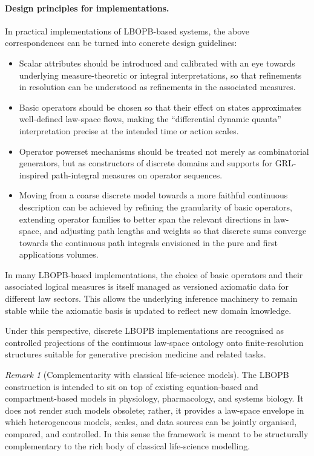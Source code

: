 \documentclass[11pt]{book}
\theoremstyle{plain}
\theoremstyle{definition}
\theoremstyle{remark}
\newtheorem{remark}[theorem]{Remark}
\begin{document}
\paragraph{Design principles for implementations.}
In practical implementations of LBOPB-based systems, the above
correspondences can be turned into concrete design guidelines:
\begin{itemize}
  \item Scalar attributes should be introduced and calibrated with an
        eye towards underlying measure-theoretic or integral
        interpretations, so that refinements in resolution can be
        understood as refinements in the associated measures.
  \item Basic operators should be chosen so that their effect on
        states approximates well-defined law-space flows, making the
        ``differential dynamic quanta'' interpretation precise at the
        intended time or action scales.
  \item Operator powerset mechanisms should be treated not merely as
        combinatorial generators, but as constructors of discrete
        domains and supports for GRL-inspired path-integral measures
        on operator sequences.
  \item Moving from a coarse discrete model towards a more faithful
        continuous description can be achieved by refining the granularity
        of basic operators, extending operator families to better span
        the relevant directions in law-space, and adjusting path
        lengths and weights so that discrete sums converge towards the
        continuous path integrals envisioned in the pure and first
        applications volumes.
\end{itemize}
In many LBOPB-based implementations, the choice of basic operators
and their associated logical measures is itself managed as versioned
axiomatic data for different law sectors. This allows the underlying
inference machinery to remain stable while the axiomatic basis is
updated to reflect new domain knowledge.

Under this perspective, discrete LBOPB implementations are recognised
as controlled projections of the continuous law-space ontology onto
finite-resolution structures suitable for generative precision
medicine and related tasks.

\begin{remark}[Complementarity with classical life-science models]
The LBOPB construction is intended to sit on top of existing
equation-based and compartment-based models in physiology,
pharmacology, and systems biology. It does not render such models
obsolete; rather, it provides a law-space envelope in which
heterogeneous models, scales, and data sources can be jointly
organised, compared, and controlled. In this sense the framework is
meant to be structurally complementary to the rich body of classical
life-science modelling.
\end{remark}
\end{document}
